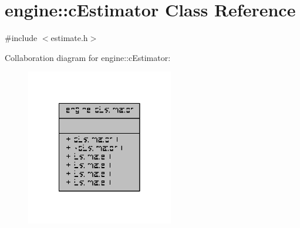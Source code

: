 \hypertarget{classengine_1_1cEstimator}{\section{engine\-:\-:c\-Estimator Class Reference}
\label{classengine_1_1cEstimator}
}


{\ttfamily \#include $<$estimate.\-h$>$}



Collaboration diagram for engine\-:\-:c\-Estimator\-:
\nopagebreak
\begin{figure}[H]
\begin{center}
\leavevmode
\includegraphics[width=182pt]{classengine_1_1cEstimator__coll__graph}
\end{center}
\end{figure}

